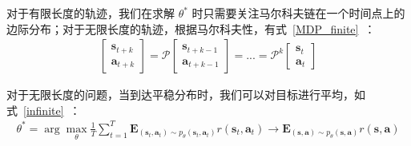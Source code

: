对于有限长度的轨迹，我们在求解 $\theta^*$ 时只需要关注马尔科夫链在一个时间点上的边际分布；对于无限长度的轨迹，根据马尔科夫性，有式~\eqref{MDP_finite}~：
\begin{equation}
\label{MDP_finite}
\begin{aligned}
\left[\begin{array}{l}\mathbf{s}_{t+k}\\\mathbf{a}_{t+k}\end{array}\right]=\mathcal{P}\left[\begin{array}{l}\mathbf{s}_{t+k-1}\\\mathbf{a}_{t+k-1}\end{array}\right]=...=\mathcal{P}^k\left[\begin{array}{l}\mathbf{s}_{t}\\\mathbf{a}_{t}\end{array}\right]
\end{aligned}
\end{equation}

对于无限长度的问题，当到达平稳分布时，我们可以对目标进行平均，如式~\eqref{infinite}~：
\begin{equation}
\label{infinite}
\begin{aligned}
\theta^*=\arg\max_\theta\frac{1}{T}\sum_{t=1}^T\mathbf{E}_{(\mathbf{s}_t,\mathbf{a}_t)\sim p_\theta(\mathbf{s}_t,\mathbf{a}_t)}r(\mathbf{s}_t,\mathbf{a}_t)\rightarrow \mathbf{E}_{(\mathbf{s},\mathbf{a})\sim p_\theta(\mathbf{s},\mathbf{a})}r(\mathbf{s},\mathbf{a})
\end{aligned}
\end{equation}

%
%
%

